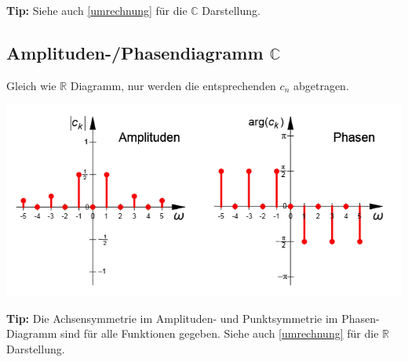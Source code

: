 \noindent\textbf{Tip:} Siehe auch \ref{umrechnung} für die $\mathbb{C}$ Darstellung.

\subsection{Amplituden-/Phasendiagramm $\mathbb{C}$}
Gleich wie $\mathbb{R}$ Diagramm, nur werden die entsprechenden $c_n$ abgetragen.\\
\begin{center}
	\includegraphics[width=\columnwidth]{Images/phasen_diagram_complex}
\end{center}

\noindent\textbf{Tip:} Die Achsensymmetrie im Amplituden- und Punktsymmetrie im Phasen-Diagramm sind für alle Funktionen gegeben. Siehe auch \ref{umrechnung} für die $\mathbb{R}$ Darstellung.